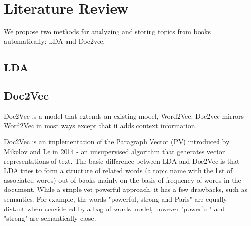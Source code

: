 
\section{Literature Review} \label{section:algorithms}
We propose two methods for analyzing and storing topics from books automatically: LDA and Doc2vec. 

\subsection{LDA}




\subsection{Doc2Vec}
Doc2Vec is a model that extends an existing model, Word2Vec. Doc2vec mirrors Word2Vec in most ways except that it adds context information. \cite{RefWorks:doc:5a6e5748e4b0d609eec798dd}





	Doc2Vec is an implementation of the Paragraph Vector (PV) introduced by Mikolov and Le in 2014 - an unsupervised algorithm that generates vector representations of text. \cite{RefWorks:doc:5a6e5746e4b0d609eec798d7}  The basic difference between LDA and Doc2Vec is that LDA tries to form a structure of related words (a topic name with the list of associated words) out of books mainly on the basis of frequency of words in the document. While a simple yet powerful approach, it has a few drawbacks, such as semantics. For example, the words "powerful, strong and Paris" are equally distant when considered by a bag of words model, however "powerful" and "strong" are semantically close. \cite{RefWorks:doc:5a6e5746e4b0d609eec798d7}
	
